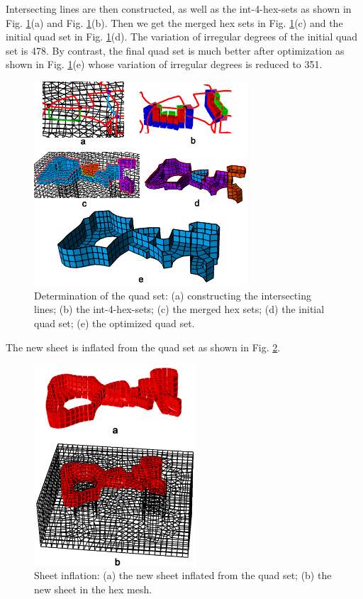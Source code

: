 \documentclass[final,5p,times,twocolumn]{elsarticle}
\begin{document}
Intersecting lines are then constructed, as well as the int-4-hex-sets as shown in Fig. \ref{fig:exam1_quad_set}(a) and Fig. \ref{fig:exam1_quad_set}(b). Then we get the merged hex sets in Fig. \ref{fig:exam1_quad_set}(c) and the initial quad set in Fig. \ref{fig:exam1_quad_set}(d). The variation of irregular degrees of the initial quad set is 478. By contrast, the final quad set is much better after optimization as shown in Fig. \ref{fig:exam1_quad_set}(e) whose variation of irregular degrees is reduced to 351.

\begin{figure}[htbp]
\begin{center}
\includegraphics[width=8cm]{exam1_quad_set.png}
\caption{Determination of the quad set: (a) constructing the intersecting lines; (b) the int-4-hex-sets; (c) the merged hex sets; (d) the initial quad set; (e) the optimized quad set.}
\label{fig:exam1_quad_set}
\end{center}
\end{figure}

The new sheet is inflated from the quad set as shown in Fig. \ref{fig:exam1_sheet}.

\begin{figure}[htbp]
\begin{center}
\includegraphics[width=6cm]{exam1_sheet.png}
\caption{Sheet inflation: (a) the new sheet inflated from the quad set; (b) the new sheet in the hex mesh.}
\label{fig:exam1_sheet}
\end{center}
\end{figure}
\end{document}
